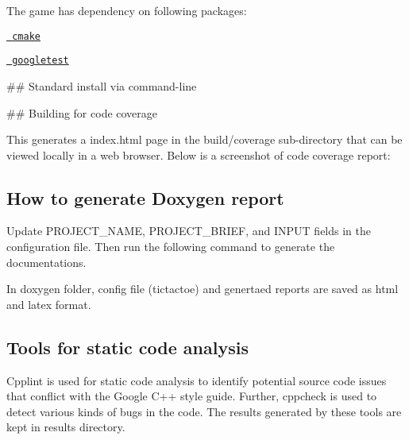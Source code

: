 The game has dependency on following packages\+:
\begin{DoxyEnumerate}
\item \href{https://cmake.org/}\texttt{ cmake}
\item \href{https://github.com/google/googletest}\texttt{ googletest}
\end{DoxyEnumerate}

\#\# Standard install via command-\/line 
\begin{DoxyCode}{0}
\end{DoxyCode}


\#\# Building for code coverage 
\begin{DoxyCode}{0}
\end{DoxyCode}
 This generates a index.\+html page in the build/coverage sub-\/directory that can be viewed locally in a web browser. Below is a screenshot of code coverage report\+: 

 

\subsection*{How to generate Doxygen report}


\begin{DoxyCode}{0}
\end{DoxyCode}
 Update P\+R\+O\+J\+E\+C\+T\+\_\+\+N\+A\+ME, P\+R\+O\+J\+E\+C\+T\+\_\+\+B\+R\+I\+EF, and I\+N\+P\+UT fields in the configuration file. Then run the following command to generate the documentations. 
\begin{DoxyCode}{0}
\end{DoxyCode}
 In doxygen folder, config file (tictactoe) and genertaed reports are saved as html and latex format.

\subsection*{Tools for static code analysis}

Cpplint is used for static code analysis to identify potential source code issues that conflict with the Google C++ style guide. Further, cppcheck is used to detect various kinds of bugs in the code. The results generated by these tools are kept in results directory. 
